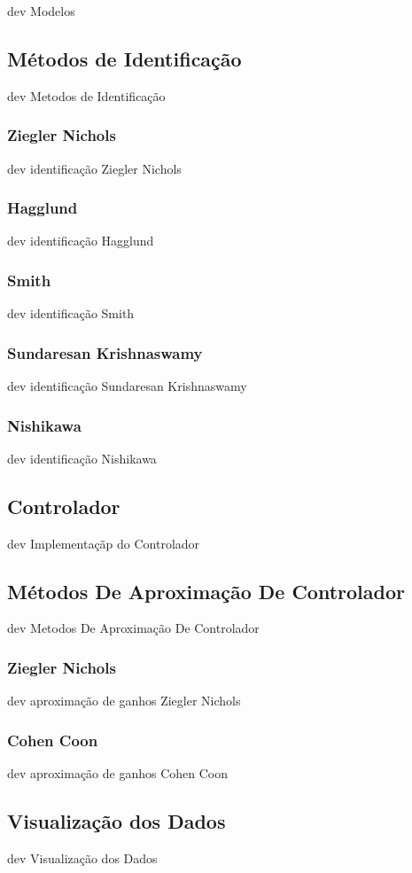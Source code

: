 dev Modelos

\subsection{Métodos de Identificação}

dev Metodos de Identificação

\subsubsection{Ziegler Nichols}

dev identificação Ziegler Nichols

\subsubsection{Hagglund}

dev identificação Hagglund

\subsubsection{Smith}

dev identificação Smith

\subsubsection{Sundaresan Krishnaswamy}

dev identificação Sundaresan Krishnaswamy

\subsubsection{Nishikawa}

dev identificação Nishikawa

\subsection{Controlador}

dev Implementaçãp do Controlador

\subsection{Métodos De Aproximação De Controlador}

dev Metodos De Aproximação De Controlador

\subsubsection{Ziegler Nichols}

dev aproximação de ganhos Ziegler Nichols

\subsubsection{Cohen Coon}

dev aproximação de ganhos Cohen Coon

\subsection{Visualização dos Dados}

dev Visualização dos Dados

